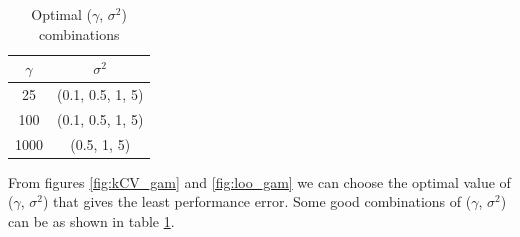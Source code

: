 \documentclass[12pt]{report}
\begin{document}
{\begin{table}
	\caption{Optimal ($\gamma$, $\sigma^2$) combinations}\label{table:4}
	\begin{tabular}{|c|c|}
		\hline
		$\gamma$ & $\sigma^2$ \\ \hline
		25 & (0.1, 0.5, 1, 5) \\ \hline
		100 & (0.1, 0.5, 1, 5)  \\ \hline
		1000 & (0.5, 1, 5)  \\ \hline
	\end{tabular}
\end{table}
From figures \ref{fig:kCV_gam} and \ref{fig:loo_gam} we can choose the optimal value of ($\gamma$, $\sigma^2$) that gives the least performance error. Some good combinations of ($\gamma$, $\sigma^2$) can be as shown in table \ref{table:4}.\\
 \begin{figure}[!htbp]
	\begin{floatrow}
\end{floatrow}
\end{figure}}
\end{document}
